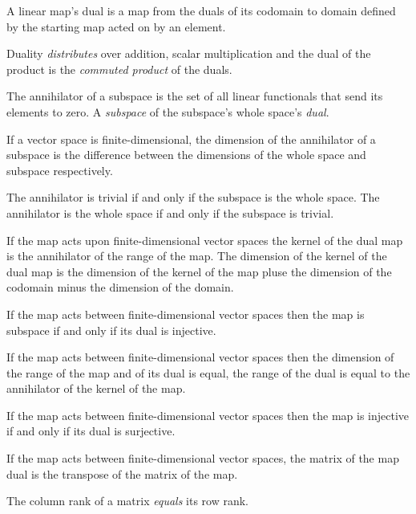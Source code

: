 \begin{multicols}{3}
  A linear map's dual is a map from the duals of its codomain
  to domain defined by the starting map acted on by an element.

  Duality \textit{distributes} over addition, scalar multiplication
  and the dual of the product is the \textit{commuted product} of the duals.

  The annihilator of a subspace is the set of all linear functionals that send its elements to zero.
   A \textit{subspace} of the subspace's whole space's \textit{dual}.

  If a vector space is finite-dimensional, the dimension of the annihilator of a subspace is the difference
  between the dimensions of the whole space and subspace respectively.

  The annihilator is trivial if and only if the subspace is the whole space.
  The annihilator is the whole space if and only if the subspace is trivial.

  If the map acts upon finite-dimensional vector spaces
  the kernel of the dual map is the annihilator of the range of the map.
  The dimension of the kernel of the dual map is the dimension of the kernel
  of the map pluse the dimension of the codomain minus the dimension of the domain.
  
  If the map acts between finite-dimensional vector spaces then the map is subspace if and only if its dual is injective.

  If the map acts between finite-dimensional vector spaces then the dimension of the range of the map and of its dual is equal,
  the range of the dual is equal to the annihilator of the kernel of the map.

  If the map acts between finite-dimensional vector spaces then the map is injective if and only if its dual is surjective.

  If the map acts between finite-dimensional vector spaces, the matrix of the map dual is the transpose of the matrix of the map.
  
  The column rank of a matrix \textit{equals} its row rank.


\end{multicols}
